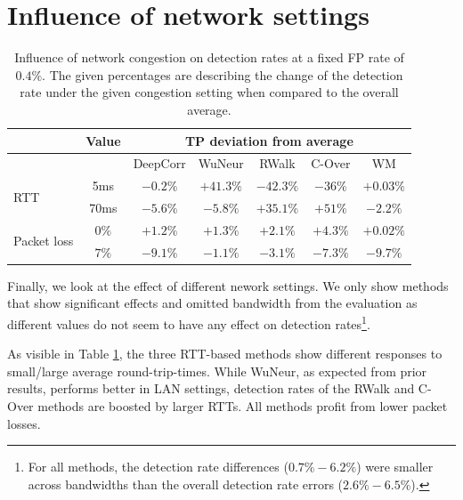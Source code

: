 \documentclass[runningheads,11pt]{llncs}\usepackage[]{graphicx}\usepackage[]{color}
\begin{document}
\section{Influence of network settings}\label{Sec:InfluenceNetwork}

\begin{table}
\centering
\begin{tabular}{l|c|c|c|c|c|c}
& Value & \multicolumn{5}{c}{TP deviation from average}\\ \hline
 & &DeepCorr & WuNeur & RWalk& C-Over & WM \\ \hline
\multirow{2}{*}{RTT} & 5ms& $-0.2\%$ & $+41.3\%$& $-42.3\%$ & $-36\%$ & $+0.03\%$ \\ \cline{2-7}
 & 70ms & $-5.6\%$ & $-5.8\%$& $+35.1\%$ & $+51\%$& $-2.2\%$\\ \hline

\multirow{2}{*}{Packet loss} & $0\%$ & $+1.2\%$& $+1.3\%$ & $+2.1\%$ & $+4.3\%$ & $+0.02\%$\\ \cline{2-7}
 & $7\%$ & $-9.1\%$& $-1.1\%$ & $-3.1\%$ & $-7.3\%$ & $-9.7\%$\\ \hline %



\end{tabular}
\caption{Influence of network congestion on detection rates at a fixed FP rate of $0.4\%$. The given percentages are describing the change of the detection rate under the given congestion setting when compared to the overall average.}\label{Tab:Congestion}
\end{table}

Finally, we look at the effect of different nework settings. We only show methods that show significant effects and omitted bandwidth from the evaluation as different values do not seem to have any effect on detection rates\footnote{For all methods, the detection rate differences ($0.7\%-6.2\%$) were smaller across bandwidths than the overall detection rate errors ($2.6\%-6.5\%$).}.

As visible in Table \ref{Tab:Congestion}, the three RTT-based methods show different responses to small/large average round-trip-times. While WuNeur, as expected from prior results, performs better in LAN settings, detection rates of the RWalk and C-Over methods are boosted by larger RTTs. All methods profit from lower packet losses.


 
\end{document}
